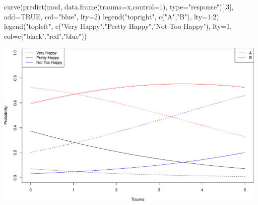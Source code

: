 \documentclass[
  ignorenonframetext,
]{beamer}
\newenvironment{Shaded}{\begin{snugshade}}{\end{snugshade}}
\newcommand{\AttributeTok}[1]{\textcolor[rgb]{0.77,0.63,0.00}{#1}}
\newcommand{\ConstantTok}[1]{\textcolor[rgb]{0.00,0.00,0.00}{#1}}
\newcommand{\DecValTok}[1]{\textcolor[rgb]{0.00,0.00,0.81}{#1}}
\newcommand{\FunctionTok}[1]{\textcolor[rgb]{0.00,0.00,0.00}{#1}}
\newcommand{\NormalTok}[1]{#1}
\newcommand{\SpecialCharTok}[1]{\textcolor[rgb]{0.00,0.00,0.00}{#1}}
\newcommand{\StringTok}[1]{\textcolor[rgb]{0.31,0.60,0.02}{#1}}
\begin{document}
\begin{frame}[fragile]{}
\begin{Shaded}
\begin{Highlighting}[]
\FunctionTok{curve}\NormalTok{(}\FunctionTok{predict}\NormalTok{(mod, }\FunctionTok{data.frame}\NormalTok{(}\AttributeTok{trauma=}\NormalTok{x,}\AttributeTok{control=}\DecValTok{1}\NormalTok{), }\AttributeTok{type=}\StringTok{"response"}\NormalTok{)[,}\DecValTok{3}\NormalTok{],}
      \AttributeTok{add=}\ConstantTok{TRUE}\NormalTok{, }\AttributeTok{col=}\StringTok{"blue"}\NormalTok{, }\AttributeTok{lty=}\DecValTok{2}\NormalTok{)}
\FunctionTok{legend}\NormalTok{(}\StringTok{"topright"}\NormalTok{, }\FunctionTok{c}\NormalTok{(}\StringTok{"A"}\NormalTok{,}\StringTok{"B"}\NormalTok{), }\AttributeTok{lty=}\DecValTok{1}\SpecialCharTok{:}\DecValTok{2}\NormalTok{)}
\FunctionTok{legend}\NormalTok{(}\StringTok{"topleft"}\NormalTok{, }\FunctionTok{c}\NormalTok{(}\StringTok{"Very Happy"}\NormalTok{,}\StringTok{"Pretty Happy"}\NormalTok{,}\StringTok{"Not Too Happy"}\NormalTok{), }\AttributeTok{lty=}\DecValTok{1}\NormalTok{,}
       \AttributeTok{col=}\FunctionTok{c}\NormalTok{(}\StringTok{"black"}\NormalTok{,}\StringTok{"red"}\NormalTok{,}\StringTok{"blue"}\NormalTok{))}
\end{Highlighting}
\end{Shaded}
\end{frame}

\begin{frame}{}
\protect\hypertarget{section-7}{}
\includegraphics{week6_p2_files/figure-beamer/unnamed-chunk-9-1.pdf}
\end{frame}
\end{document}
